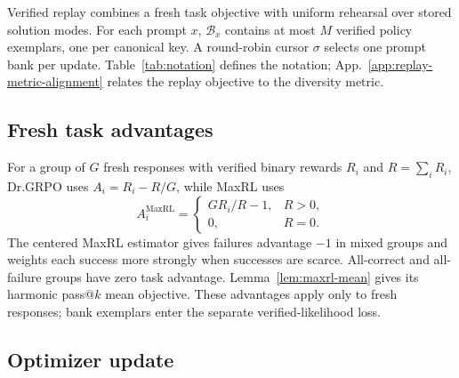 \documentclass{article}
\newcommand{\1}{\mathbf 1}
\theoremstyle{remark}
\theoremstyle{definition}
\theoremstyle{plain}
\begin{document}
Verified replay combines a fresh task objective with uniform rehearsal over
stored solution modes. For each prompt $x$, $\mathcal B_x$ contains at most
$M$ verified policy exemplars, one per canonical key. A round-robin cursor
$\sigma$ selects one prompt bank per update. Table~\ref{tab:notation}
defines the notation; App.~\ref{app:replay-metric-alignment} relates the
replay objective to the diversity metric.


\subsection{Fresh task advantages}
\label{app:binary-maxrl}

For a group of $G$ fresh responses with verified binary rewards $R_i$ and
$R=\sum_i R_i$, Dr.GRPO uses $A_i=R_i-R/G$, while MaxRL uses
\[
 A_i^{\mathrm{MaxRL}}=
 \begin{cases}
 G R_i/R-1, & R>0,\\
 0, & R=0.
 \end{cases}
\]
The centered MaxRL estimator \citep{tajwar2026maxrl} gives failures advantage
$-1$ in mixed groups and weights each success more strongly when successes
are scarce. All-correct and all-failure groups have zero task advantage.
Lemma~\ref{lem:maxrl-mean} gives its harmonic pass@\(k\) mean objective.
These advantages apply only to fresh responses; bank exemplars enter the
separate verified-likelihood loss.

\subsection{Optimizer update}
\label{app:algorithm-update}
\end{document}
